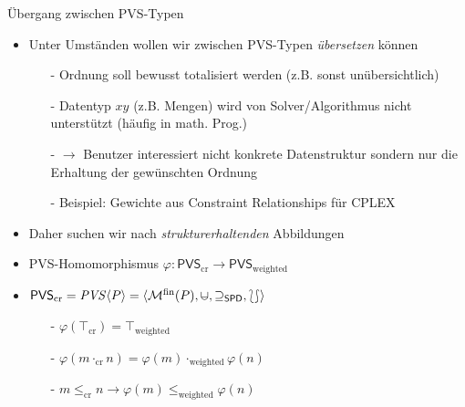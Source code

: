 \begin{frame}{Übergang zwischen PVS-Typen}\small

\begin{itemize}
\item Unter Umständen wollen wir zwischen PVS-Typen \emph{übersetzen} können 
%
\begin{itemize}
\item[-] Ordnung soll bewusst totalisiert werden (z.B. sonst unübersichtlich)
\item[-] Datentyp $xy$ (z.B. Mengen) wird von Solver/Algorithmus nicht unterstützt (häufig in math. Prog.)
\item[-] $\rightarrow$ Benutzer interessiert \alert{nicht} konkrete Datenstruktur sondern nur die Erhaltung der gewünschten Ordnung
\item[-] Beispiel: Gewichte aus Constraint Relationships für CPLEX
\end{itemize}
%
\vspace*{2ex}
\item Daher suchen wir nach \emph{strukturerhaltenden} Abbildungen \pause
\item PVS-Homomorphismus $\varphi : \mathsf{PVS}_{\mathrm{cr}} \to  \mathsf{PVS}_{\mathrm{weighted}}$ \pause 
\item $\mathsf{PVS}_{\mathrm{cr}} = \mathit{PVS}\langle P \rangle = \langle \mathcal{M}^{\mathrm{fin}} (P), \mcup, \supseteq_{\mathsf{SPD}}, \lbag \rbag \rangle$
\begin{itemize}
\item[-] $\varphi(\top_{\mathrm{cr}}) = \top_{\mathrm{weighted}}$ \pause 
\item[-] $\varphi(m \cdot_{\mathrm{cr}} n) = \varphi(m) \cdot_{\mathrm{weighted}} \varphi(n)$ \pause 
\item[-] $m \leq_{\mathrm{cr}} n \rightarrow \varphi(m) \leq_{\mathrm{weighted}} \varphi(n)$ \pause 
\end{itemize}


\end{itemize}
\end{frame}
